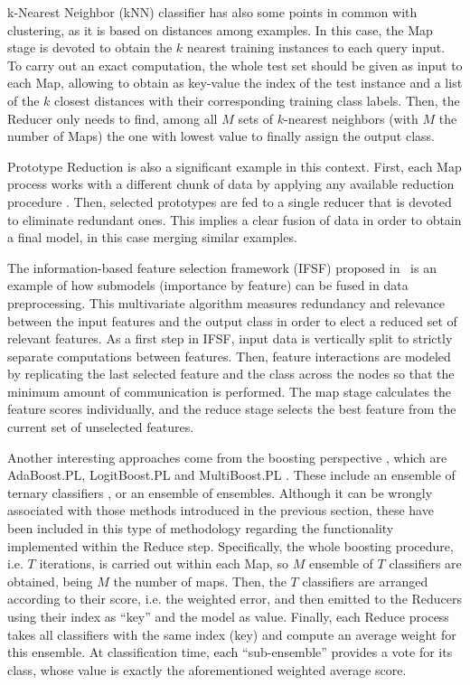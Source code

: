 \documentclass[3p,review]{elsarticle}
\begin{document}
k-Nearest Neighbor (kNN) classifier \cite{MailloRTH17-kNN} has also some points in common with clustering, as it is based on distances among examples. In this case, the Map stage is devoted to obtain the $k$ nearest training instances to each query input. To carry out an exact computation, the whole test set should be given as input to each Map, allowing to obtain as key-value the index of the test instance and a list of the $k$ closest distances with their corresponding training class labels. Then, the Reducer only needs to find, among all $M$ sets of $k$-nearest neighbors (with $M$ the number of Maps) the one with lowest value to finally assign the output class.

Prototype Reduction \cite{TrigueroPBGH15-PR} is also a significant example in this context. First, each Map process works with a different chunk of data by applying any available reduction procedure \cite{TrigueroDGH12}. Then, selected prototypes are fed to a single reducer that is devoted to eliminate redundant ones. This implies a clear fusion of data in order to obtain a final model, in this case merging similar examples. 

The information-based feature selection framework (IFSF) proposed in~\cite{Ramirez-Gallego17-mrmr} is an example of how submodels (importance by feature) can be fused in data preprocessing. This multivariate algorithm measures redundancy and relevance between the input features and the output class in order to elect a reduced set of relevant features. As a first step in IFSF, input data is vertically split to strictly separate computations between features. Then, feature interactions are modeled by replicating the last selected feature and the class across the nodes so that the minimum amount of communication is performed. The map stage calculates the feature scores individually, and the reduce stage selects the best feature from the current set of unselected features.


Another interesting approaches come from the boosting perspective \cite{schapire99brief}, which are AdaBoost.PL, LogitBoost.PL and MultiBoost.PL \cite{Palit12-Boost}. These include an ensemble of ternary classifiers \cite{schapire99confidence}, or an ensemble of ensembles. Although it can be wrongly associated with those methods introduced in the previous section, these have been included in this type of methodology regarding the functionality implemented within the Reduce step. Specifically, the whole boosting procedure, i.e. $T$ iterations, is carried out within each Map, so $M$ ensemble of $T$ classifiers are obtained, being $M$ the number of maps. Then, the $T$ classifiers are arranged according to their score, i.e. the weighted error, and then emitted to the Reducers using their index as ``key'' and the model as value. Finally, each Reduce process takes all classifiers with the same index (key) and compute an average weight for this ensemble. At classification time, each ``sub-ensemble'' provides a vote for its class, whose value is exactly the aforementioned weighted average score.  
\end{document}
